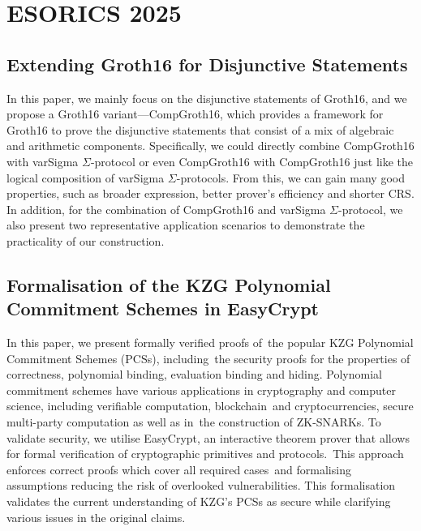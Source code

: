 \documentclass[11pt,oneside]{book}
\theoremstyle{definition}
\theoremstyle{remark}
\theoremstyle{plain}
\begin{document}
\chapter{ESORICS 2025}
\section{\cite{10.1007/978-3-032-07891-9_26} Extending Groth16 for Disjunctive Statements}
In this paper, we mainly focus on the disjunctive statements of Groth16, and we propose a Groth16 variant---CompGroth16, which provides a framework for Groth16 to prove the disjunctive statements that consist of a mix of algebraic and arithmetic components. Specifically, we could directly combine CompGroth16 with varSigma $\Sigma$-protocol or even CompGroth16 with CompGroth16 just like the logical composition of varSigma $\Sigma$-protocols. From this, we can gain many good properties, such as broader expression, better prover's efficiency and shorter CRS. In addition, for the combination of CompGroth16 and varSigma $\Sigma$-protocol, we also present two representative application scenarios to demonstrate the practicality of our construction.

\section{\cite{10.1007/978-3-032-07891-9_16} Formalisation of the KZG Polynomial Commitment Schemes in EasyCrypt}
In this paper, we present formally verified proofs of the popular KZG Polynomial Commitment Schemes (PCSs), including the security proofs for the properties of correctness, polynomial binding, evaluation binding and hiding. Polynomial commitment schemes have various applications in cryptography and computer science, including verifiable computation, blockchain and cryptocurrencies, secure multi-party computation as well as in the construction of ZK-SNARKs. To validate security, we utilise EasyCrypt, an interactive theorem prover that allows for formal verification of cryptographic primitives and protocols. This approach enforces correct proofs which cover all required cases and formalising assumptions reducing the risk of overlooked vulnerabilities. This formalisation validates the current understanding of KZG's PCSs as secure while clarifying various issues in the original claims.
\end{document}
